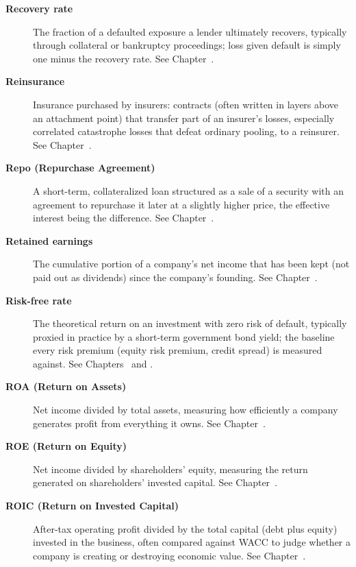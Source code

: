 \documentclass[../ai_in_finance]{subfiles}
\begin{document}
\begin{description}
\item[\textbf{Recovery rate}] The fraction of a defaulted exposure a lender ultimately recovers, typically through collateral or bankruptcy proceedings; loss given default is simply one minus the recovery rate. See Chapter~.

\item[\textbf{Reinsurance}] Insurance purchased by insurers: contracts (often written in layers above an attachment point) that transfer part of an insurer's losses, especially correlated catastrophe losses that defeat ordinary pooling, to a reinsurer. See Chapter~.

\item[\textbf{Repo (Repurchase Agreement)}] A short-term, collateralized loan structured as a sale of a security with an agreement to repurchase it later at a slightly higher price, the effective interest being the difference. See Chapter~.

\item[\textbf{Retained earnings}] The cumulative portion of a company's net income that has been kept (not paid out as dividends) since the company's founding. See Chapter~.

\item[\textbf{Risk-free rate}] The theoretical return on an investment with zero risk of default, typically proxied in practice by a short-term government bond yield; the baseline every risk premium (equity risk premium, credit spread) is measured against. See Chapters~ and .

\item[\textbf{ROA (Return on Assets)}] Net income divided by total assets, measuring how efficiently a company generates profit from everything it owns. See Chapter~.

\item[\textbf{ROE (Return on Equity)}] Net income divided by shareholders' equity, measuring the return generated on shareholders' invested capital. See Chapter~.

\item[\textbf{ROIC (Return on Invested Capital)}] After-tax operating profit divided by the total capital (debt plus equity) invested in the business, often compared against WACC to judge whether a company is creating or destroying economic value. See Chapter~.


\end{description}
\end{document}
